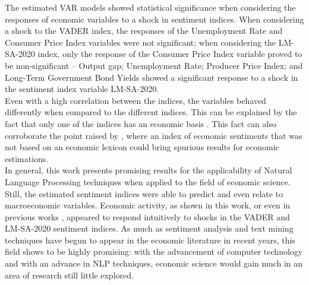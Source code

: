 The estimated VAR models showed statistical significance when considering the responses of economic variables to a shock in sentiment indices. When considering a shock to the VADER index, the responses of the Unemployment Rate and Consumer Price Index variables were not significant; when considering the LM-SA-2020 index, only the response of the Consumer Price Index variable proved to be non-significant -- Output gap; Unemployment Rate; Producer Price Index; and Long-Term Government Bond Yields showed a significant response to a shock in the sentiment index variable LM-SA-2020.\\

Even with a high correlation between the indices, the variables behaved differently when compared to the different indices. This can be explained by the fact that only one of the indices has an economic basis \cite[]{loughran2011liability}. This fact can also corroborate the point raised by \cite{loughran2011liability, shapiro2020measuring}, where an index of economic sentiments that was not based on an economic lexicon could bring spurious results for economic estimations.\\

In general, this work presents promising results for the applicability of Natural Language Processing techniques when applied to the field of economic science. Still, the estimated sentiment indices were able to predict and even relate to macroeconomic variables. Economic activity, as shown in this work, or even in previous works \cite[]{shapiro2020measuring, barsky2012information}, appeared to respond intuitively to shocks in the VADER and LM-SA-2020 sentiment indices. As much as sentiment analysis and text mining techniques have begun to appear in the economic literature in recent years, this field shows to be highly promising: with the advancement of computer technology and with an advance in NLP techniques, economic science would gain much in an area of research still little explored.